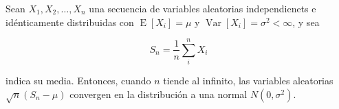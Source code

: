 \documentclass{article}
\begin{document}
Sean $X_1, X_2, \ldots, X_n$ una secuencia de variables aleatorias
independienets e idénticamente distribuidas con
$\operatorname{E}[X_i] = \mu$ y $\operatorname{Var}[X_i] = \sigma^2 < \infty$,  y sea

\begin{equation*}
S_n = \frac{1}{n}\sum_{i}^{n} X_i
\end{equation*}

indica su media. Entonces, cuando $n$ tiende al infinito, las
variables aleatorias $\sqrt{n}(S_n - \mu)$ convergen en la
distribución a una normal $N(0, \sigma^2)$.

\end{document}
